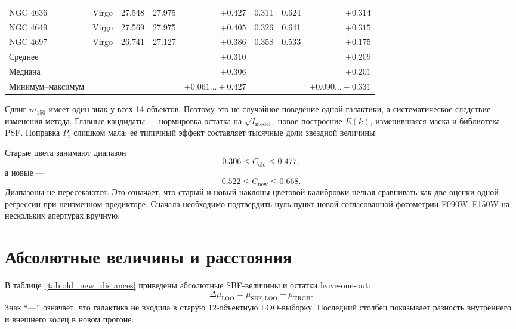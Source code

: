 \documentclass[12pt,a4paper]{article}
\begin{document}
\begin{landscape}
\begin{longtable}{llrrrrrr}
NGC 4636 & Virgo  & 27.548 & 27.975 & \(+0.427\) & 0.311 & 0.624 & \(+0.314\) \\
NGC 4649 & Virgo  & 27.569 & 27.975 & \(+0.405\) & 0.326 & 0.641 & \(+0.315\) \\
NGC 4697 & Virgo  & 26.741 & 27.127 & \(+0.386\) & 0.358 & 0.533 & \(+0.175\) \\
\midrule
Среднее & & & & \(+0.310\) & & & \(+0.209\) \\
Медиана & & & & \(+0.306\) & & & \(+0.201\) \\
Минимум--максимум & & & & \(+0.061\ldots+0.427\) &
& & \(+0.090\ldots+0.331\) \\
\end{longtable}
\end{landscape}

Сдвиг \(\overline m_{150}\) имеет один знак у всех 14
объектов. Поэтому это не случайное поведение одной галактики,
а систематическое следствие изменения метода. Главные
кандидаты --- нормировка остатка на
\(\sqrt{I_{\mathrm{model}}}\), новое построение \(E(k)\),
изменившаяся маска и библиотека PSF. Поправка
\(P_{\mathrm r}\) слишком мала: её типичный эффект составляет
тысячные доли звёздной величины.

Старые цвета занимают диапазон
\begin{equation}
    0.306 \leq C_{\mathrm{old}} \leq 0.477,
\end{equation}
а новые ---
\begin{equation}
    0.522 \leq C_{\mathrm{new}} \leq 0.668.
\end{equation}
Диапазоны не пересекаются. Это означает, что старый и новый
наклоны цветовой калибровки нельзя сравнивать как две оценки
одной регрессии при неизменном предикторе. Сначала необходимо
подтвердить нуль-пункт новой согласованной фотометрии
F090W--F150W на нескольких апертурах вручную.

\section{Абсолютные величины и расстояния}

В таблице~\ref{tab:old_new_distances} приведены абсолютные
SBF-величины и остатки leave-one-out:
\begin{equation}
    \Delta\mu_{\mathrm{LOO}}
    = \mu_{\mathrm{SBF,LOO}}-\mu_{\mathrm{TRGB}}.
\end{equation}
Знак ``---'' означает, что галактика не входила в старую
12-объектную LOO-выборку. Последний столбец показывает
разность внутреннего и внешнего колец в новом прогоне.
\end{document}
